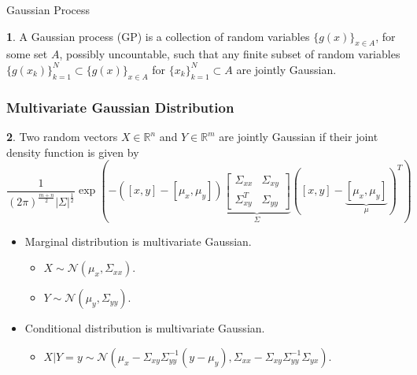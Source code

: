 \documentclass[11pt]{beamer}
\theoremstyle{plain}
\theoremstyle{definition}
\newtheorem{dfn}{}[section]
\begin{document}
\begin{frame}{Gaussian Process}
\begin{dfn} 
A Gaussian process (GP) is a collection of random variables $\{g(x)\}_{x\in A}$, for some set $A$,
possibly uncountable,
 such that any finite subset of random variables
 $\{g(x_{k})\}_{k=1}^{N}\subset\{g(x)\}_{x\in A}$ for
$\{x_{k}\}_{k=1}^{N}\subset A$ are jointly Gaussian.
\end{dfn}
\end{frame}
\begin{frame}
\frametitle{Multivariate Gaussian Distribution}
\begin{dfn}
Two random vectors $X\in\mathbb{R}^{n}$ and $Y\in\mathbb{R}^{m}$
are jointly Gaussian if their joint density function is given by
\begin{equation*}
\frac{1}{(2\pi)^{\frac{m+n}{2}}|\Sigma|^{\frac{1}{2}}}
\exp(-([x,y]-[\mu_{x},\mu_{y}])
\underbrace{\begin{bmatrix}
\Sigma_{xx} & \Sigma_{xy}\\
\Sigma_{xy}^{T} & \Sigma_{yy}
\end{bmatrix}}_{\Sigma}
([x,y]-\underbrace{[\mu_{x},\mu_{y}]}_{\mu})^{T})
\end{equation*}
\end{dfn}
\begin{itemize}
\item Marginal distribution is multivariate Gaussian.
	\begin{itemize}
		\item $X\sim\mathcal{N}(\mu_{x},\Sigma_{xx})$.
		\item $Y\sim\mathcal{N}(\mu_{y},\Sigma_{yy})$.
	\end{itemize}
\item Conditional distribution is multivariate Gaussian.
	\begin{itemize}
		\item $X|Y=y\sim\mathcal{N}(\mu_{x}-\Sigma_{xy}\Sigma_{yy}^{-1}
		(y-\mu_{y}),\Sigma_{xx}-\Sigma_{xy}\Sigma_{yy}^{-1}\Sigma_{yx})$.
	\end{itemize}
\end{itemize}
\end{frame}

\end{document}
